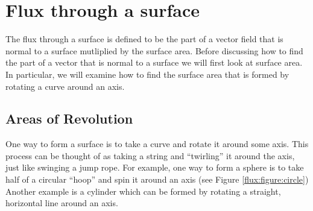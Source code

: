 \clearpage

\section{Flux through a surface}
The flux through a surface is defined to be the part of a vector field
that is normal to a surface mutliplied by the surface area. Before
discussing how to find the part of a vector that is normal to a
surface we will first look at surface area. In particular, we will
examine how to find the surface area that is formed by rotating a
curve around an axis.

\subsection{Areas of Revolution}
One way to form a surface is to take a curve and rotate it around some
axis. This process can be thought of as taking a string and
``twirling'' it around the axis, just like swinging a jump rope. For
example, one way to form a sphere is to take half of a circular
``hoop'' and spin it around an axis (see Figure
\ref{flux:figure:circle}) Another example is a cylinder which can be
formed by rotating a straight, horizontal line around an axis.

